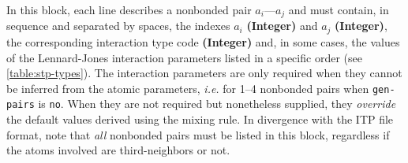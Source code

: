 \documentclass[10pt,a4paper,openany]{memoir}
\numberwithin{equation}{section}
\begin{document}
In this block, each line describes a nonbonded pair $a_i$---$a_j$ and
must contain, in sequence and separated by spaces, the indexes $a_i$
\textbf{(Integer)} and $a_j$ \textbf{(Integer)}, the corresponding
interaction type code \textbf{(Integer)} and, in some cases, the
values of the Lennard-Jones interaction parameters listed in a
specific order (see \autoref{table:stp-types}).  The interaction
parameters are only required when they cannot be inferred from the
atomic parameters, \textit{i.e.} for 1--4 nonbonded pairs when
\texttt{gen-pairs} is \texttt{no}. When they are not required but
nonetheless supplied, they \textit{override} the default values
derived using the mixing rule.  In divergence with the ITP file
format, note that \textit{all} nonbonded pairs must be listed in this
block, regardless if the atoms involved are third-neighbors or not.
\end{document}
